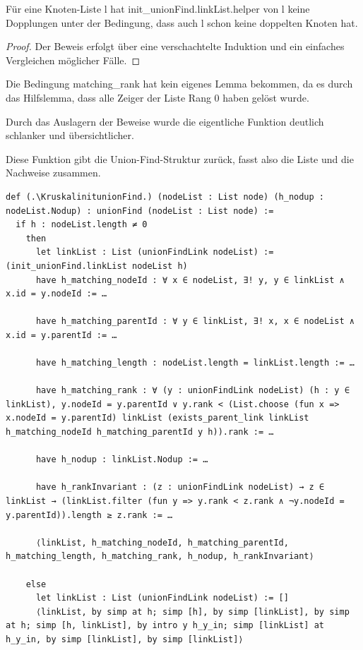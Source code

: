 \begin{lemma}[\KruskalinitunionFindlinkListhelpernodup]
  Für eine Knoten-Liste l hat init\_unionFind.linkList.helper von l keine Dopplungen unter der Bedingung, dass auch l schon keine doppelten Knoten hat.
\end{lemma}
\begin{proof}
  Der Beweis erfolgt über eine verschachtelte Induktion und ein einfaches Vergleichen möglicher Fälle.
\end{proof}

Die Bedingung matching\_rank hat kein eigenes Lemma bekommen, da es durch das Hilfslemma, dass alle Zeiger der Liste Rang 0 haben gelöst wurde.

Durch das Auslagern der Beweise wurde die eigentliche Funktion deutlich schlanker und übersichtlicher.

\begin{definition}[\KruskalinitunionFind]
  Diese Funktion gibt die Union-Find-Struktur zurück, fasst also die Liste und die Nachweise zusammen.
\end{definition}
\newpage
\begin{lstlisting}
def (.\KruskalinitunionFind.) (nodeList : List node) (h_nodup : nodeList.Nodup) : unionFind (nodeList : List node) :=
  if h : nodeList.length ≠ 0
    then
      let linkList : List (unionFindLink nodeList) := (init_unionFind.linkList nodeList h)
      have h_matching_nodeId : ∀ x ∈ nodeList, ∃! y, y ∈ linkList ∧ x.id = y.nodeId := …

      have h_matching_parentId : ∀ y ∈ linkList, ∃! x, x ∈ nodeList ∧ x.id = y.parentId := …

      have h_matching_length : nodeList.length = linkList.length := …

      have h_matching_rank : ∀ (y : unionFindLink nodeList) (h : y ∈ linkList), y.nodeId = y.parentId ∨ y.rank < (List.choose (fun x => x.nodeId = y.parentId) linkList (exists_parent_link linkList h_matching_nodeId h_matching_parentId y h)).rank := …

      have h_nodup : linkList.Nodup := …

      have h_rankInvariant : (z : unionFindLink nodeList) → z ∈ linkList → (linkList.filter (fun y => y.rank < z.rank ∧ ¬y.nodeId = y.parentId)).length ≥ z.rank := …

      ⟨linkList, h_matching_nodeId, h_matching_parentId, h_matching_length, h_matching_rank, h_nodup, h_rankInvariant⟩

    else
      let linkList : List (unionFindLink nodeList) := []
      ⟨linkList, by simp at h; simp [h], by simp [linkList], by simp at h; simp [h, linkList], by intro y h_y_in; simp [linkList] at h_y_in, by simp [linkList], by simp [linkList]⟩
\end{lstlisting}



